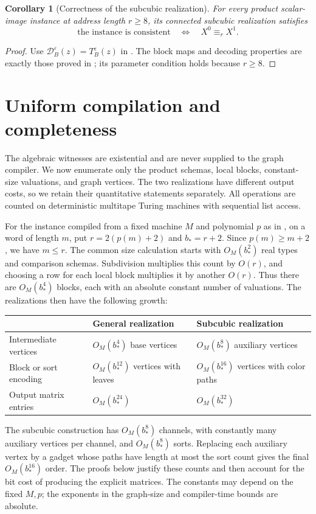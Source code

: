 \documentclass[11pt]{article}
\newtheorem{corollary}[theorem]{Corollary}
\theoremstyle{definition}
\begin{document}
\begin{corollary}[Correctness of the subcubic realization]
\label{cor:subcubic-game}
For every product scalar-image instance at address length \(r\ge8\),
its connected subcubic realization satisfies
\[
 \text{the instance is consistent}\quad\Longleftrightarrow\quad
 X^0\equiv_r X^1.
\]
\end{corollary}
\begin{proof}
Use \(\mathcal D_B^\varepsilon(z)=T_B^\varepsilon(z)\) in
. The block maps and decoding properties are
exactly those proved in ; its parameter
condition holds because \(r\ge8\).
\end{proof}

\section{Uniform compilation and completeness}\label{uniform:section}

The algebraic witnesses are existential and are never supplied to the
graph compiler. We now enumerate only the product schemas, local blocks,
constant-size valuations, and graph vertices. The two realizations have
different output costs, so we retain their quantitative statements
separately. All operations are counted on deterministic multitape
Turing machines with sequential list access.

For the instance compiled from a fixed machine $M$ and polynomial $p$
as in , on a word of length $m$, put
$r=2(p(m)+2)$ and $b_*=r+2$. Since $p(m)\ge m+2$, we have $m\le r$.
The common size calculation starts with $O_M(b_*^2)$ real types and
comparison schemas. Subdivision
multiplies this count by $O(r)$, and choosing a row for each local
block multiplies it by another $O(r)$. Thus there are $O_M(b_*^4)$
blocks, each with an absolute constant number of valuations.
The realizations then have the following growth:
\begin{center}
\begin{tabular}{@{}lll@{}}
\toprule
 & General realization & Subcubic realization\\
\midrule
Intermediate vertices & $O_M(b_*^4)$ base vertices
 & $O_M(b_*^8)$ auxiliary vertices\\
Block or sort encoding & $O_M(b_*^{12})$ vertices with leaves
 & $O_M(b_*^{16})$ vertices with color paths\\
Output matrix entries & $O_M(b_*^{24})$ & $O_M(b_*^{32})$\\
\bottomrule
\end{tabular}
\end{center}
The subcubic construction has $O_M(b_*^8)$ channels, with constantly
many auxiliary vertices per channel, and $O_M(b_*^8)$ sorts.
Replacing each auxiliary vertex by a gadget whose paths have length
at most the sort count gives the final $O_M(b_*^{16})$ order.
The proofs below justify these counts
and then account for the bit cost of producing the explicit matrices.
The constants may depend on the fixed $M,p$; the exponents in the
graph-size and compiler-time bounds are absolute.
\end{document}

